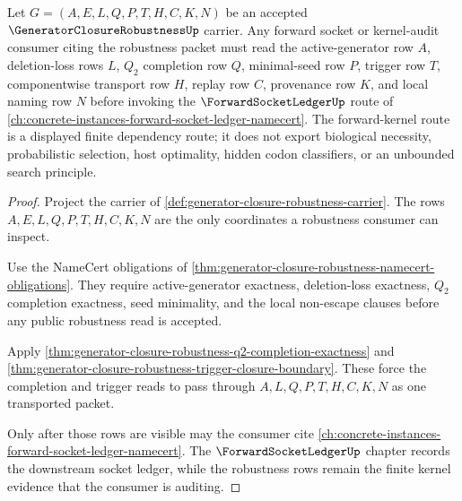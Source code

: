 \begin{theorem}
\label{thm:generator-closure-robustness-forward-kernel-consumer}
Let $G=(A,E,L,Q,P,T,H,C,K,N)$ be an accepted $\GeneratorClosureRobustnessUp$ carrier. Any forward socket or kernel-audit consumer citing the robustness packet must read the active-generator row $A$, deletion-loss rows $L$, $Q_{2}$ completion row $Q$, minimal-seed row $P$, trigger row $T$, componentwise transport row $H$, replay row $C$, provenance row $K$, and local naming row $N$ before invoking the $\ForwardSocketLedgerUp$ route of \autoref{ch:concrete-instances-forward-socket-ledger-namecert}. The forward-kernel route is a displayed finite dependency route; it does not export biological necessity, probabilistic selection, host optimality, hidden codon classifiers, or an unbounded search principle.
\end{theorem}
\begin{proof}
Project the carrier of \autoref{def:generator-closure-robustness-carrier}. The rows $A,E,L,Q,P,T,H,C,K,N$ are the only coordinates a robustness consumer can inspect.

Use the NameCert obligations of \autoref{thm:generator-closure-robustness-namecert-obligations}. They require active-generator exactness, deletion-loss exactness, $Q_{2}$ completion exactness, seed minimality, and the local non-escape clauses before any public robustness read is accepted.

Apply \autoref{thm:generator-closure-robustness-q2-completion-exactness} and \autoref{thm:generator-closure-robustness-trigger-closure-boundary}. These force the completion and trigger reads to pass through $A,L,Q,P,T,H,C,K,N$ as one transported packet.

Only after those rows are visible may the consumer cite \autoref{ch:concrete-instances-forward-socket-ledger-namecert}. The $\ForwardSocketLedgerUp$ chapter records the downstream socket ledger, while the robustness rows remain the finite kernel evidence that the consumer is auditing.
\end{proof}
